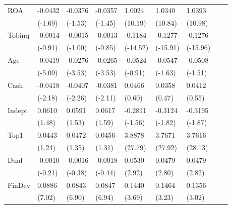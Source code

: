 \begin{table}[htbp]
\begin{tabularx}{\textwidth}{lYYYYYYYY@{}}
ROA             &  -0.0432\sym{*}  &  -0.0376         &  -0.0357         &   1.0024\sym{***}&   1.0340\sym{***}&   1.0393\sym{***}\\
                &  (-1.69)         &  (-1.53)         &  (-1.45)         &  (10.19)         &  (10.84)         &  (10.98)         \\
Tobinq          &  -0.0014         &  -0.0015         &  -0.0013         &  -0.1184\sym{***}&  -0.1277\sym{***}&  -0.1276\sym{***}\\
                &  (-0.91)         &  (-1.00)         &  (-0.85)         & (-14.52)         & (-15.91)         & (-15.96)         \\
Age             &  -0.0419\sym{***}&  -0.0276\sym{***}&  -0.0265\sym{***}&  -0.0524         &  -0.0547         &  -0.0508         \\
                &  (-5.09)         &  (-3.53)         &  (-3.53)         &  (-0.91)         &  (-1.63)         &  (-1.51)         \\
Cash            &  -0.0418\sym{**} &  -0.0407\sym{**} &  -0.0381\sym{**} &   0.0466         &   0.0358         &   0.0412         \\
                &  (-2.18)         &  (-2.26)         &  (-2.11)         &   (0.60)         &   (0.47)         &   (0.55)         \\
Indept          &   0.0610         &   0.0591         &   0.0617         &  -0.2811         &  -0.3124\sym{*}  &  -0.3195\sym{*}  \\
                &   (1.48)         &   (1.53)         &   (1.59)         &  (-1.56)         &  (-1.82)         &  (-1.87)         \\
Top1            &   0.0443         &   0.0472         &   0.0456         &   3.8878\sym{***}&   3.7671\sym{***}&   3.7616\sym{***}\\
                &   (1.24)         &   (1.35)         &   (1.31)         &  (27.79)         &  (27.92)         &  (28.13)         \\
Dual            &  -0.0010         &  -0.0016         &  -0.0018         &   0.0530\sym{***}&   0.0479\sym{***}&   0.0479\sym{***}\\
                &  (-0.21)         &  (-0.38)         &  (-0.44)         &   (2.92)         &   (2.80)         &   (2.82)         \\
FinDev          &   0.0886\sym{***}&   0.0843\sym{***}&   0.0847\sym{***}&   0.1440\sym{***}&   0.1464\sym{***}&   0.1356\sym{***}\\
                &   (7.02)         &   (6.90)         &   (6.94)         &   (3.69)         &   (3.23)         &   (3.02)         \\

\end{tabularx}
\end{table}
